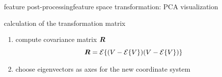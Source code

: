 		\begin{frame}{feature post-processing}{feature space transformation: PCA visualization}
			
			\vspace{-5mm}
			\pause
			calculation of the transformation matrix
			\begin{enumerate}
				\item	compute covariance matrix $\mat{R}$
                    \begin{equation*}
						\mat{R} = \mathcal{E}\lbrace(V-\mathcal{E}\lbrace V\rbrace)(V-\mathcal{E}\lbrace V\rbrace)\rbrace%
					\end{equation*}
				\item	choose eigenvectors as axes for the new coordinate system
			\end{enumerate}
		\end{frame}

